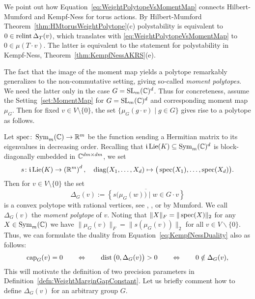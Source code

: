 We point out how Equation~\eqref{eq:WeightPolytopeVsMomentMap} connects Hilbert-Mumford and Kempf-Ness for torus actions. By Hilbert-Mumford Theorem~\ref{thm:HMtorusWeightPolytope}(c) polystability is equivalent to $0 \in \operatorname{relint} \Delta_T(v)$, which translates with \eqref{eq:WeightPolytopeVsMomentMap} to $0 \in \mu(T \cdot v)$. The latter is equivalent to the statement for polystability in Kempf-Ness, Theorem~\ref{thm:KempfNessAKRS}(e).

\bigskip

The fact that the image of the moment map yields a polytope remarkably generalizes to the non-commutative setting, giving so-called \emph{moment polytopes}. We need the latter only in the case $G = \operatorname{SL}_m(\mathbb C)^d$. Thus for concreteness, assume the Setting~\ref{set:MomentMap} for $G = \operatorname{SL}_m(\mathbb C)^d$ and corresponding moment map $\mu_G$.
Then for fixed $v \in V \setminus \{0\}$, the set $\{\mu_G(g \cdot v) \mid g \in G\}$ gives rise to a polytope as follows. 

Let $\operatorname{spec} \colon \operatorname{Sym}_m(\mathbb C) \to \mathbb R^m$ be the function sending a Hermitian matrix to its eigenvalues in decreasing order. Recalling that $\mathfrak{i} \operatorname{Lie}(K) \subseteq \operatorname{Sym}_m(\mathbb C)^d$ is block-diagonally embedded in $\mathbb C^{dm \times dm}$, we set
	\begin{align*}
		s \colon \mathfrak{i} \operatorname{Lie}(K) \to \left( \mathbb R^m \right)^d, \quad \operatorname{diag}(X_1, \ldots, X_d) \mapsto \big( \operatorname{spec}(X_1), \ldots, \operatorname{spec}(X_d) \big).
	\end{align*}
Then for $v \in V \setminus \{0\}$ the set
	\begin{equation}\label{eq:defnMomentPolytope}
		\Delta_G(v) := \overline{ \left\lbrace s \big( \mu_G(w) \big) \mid w \in G \cdot v  \right\rbrace }
	\end{equation}
is a convex polytope with rational vertices, see \cite{brion1987sur}, \cite{GuilleminSternberg}, \cite{kirwan1984convexity} or \cite[Appendix]{NessStratification} by Mumford. We call $\Delta_G(v)$ the \emph{moment polytope} of $v$. Noting that $\| X \|_F = \| \operatorname{spec}(X) \|_2$ for any $X \in \operatorname{Sym}_m(\mathbb C)$ we have $\| \mu_G(v) \|_F = \| s(\mu_G(v)) \|_2$ for all $v \in V \backslash \{0\}$. Thus, we can formulate the duality from Equation~\eqref{eq:KempfNessDuality} also as follows:
	\begin{equation}\label{eq:MomentPolytopeVsCapacity}
		\operatorname{cap}_G(v) = 0 \qquad \Leftrightarrow \qquad  \operatorname{dist} \big( 0, \Delta_G(v) \big) > 0 
		\qquad \Leftrightarrow \qquad 0 \notin \Delta_G(v),
	\end{equation}
This will motivate the definition of two precision parameters in Definition~\ref{defn:WeightMarginGapConstant}. Let us briefly comment how to define $\Delta_G(v)$ for an arbitrary group $G$.

